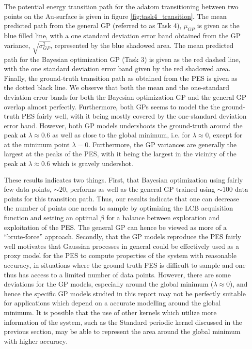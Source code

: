 \documentclass[11pt,a4paper]{article}
\begin{document}
The potential energy transition path for the adatom transitioning between two points on the Au-surface is given in figure \ref{fig:task4_transition}. The mean predicted path from the general GP (referred to as Task 4), $\mu_{GP}$ is given as the blue filled line, with a one standard deviation error band obtained from the GP variance, $\sqrt{\sigma^2_{GP}}$, represented by the blue shadowed area. The mean predicted path for the Bayesian optimization GP (Task 3) is given as the red dashed line, with the one standard deviation error band given by the red shadowed area. Finally, the ground-truth transition path as obtained from the PES is given as the dotted black line. We observe that both the mean and the one-standard deviation error bands for both the Bayesian optimization GP and the general GP overlap almost perfectly. Furthermore, both GPs seems to model the the ground-truth PES fairly well, with it being mostly covered by the one-standard deviation error band. However, both GP models undershoots the ground-truth around the peak at $\lambda\approx0.6$ as well as close to the global minimum, i.e. for $\lambda\approx 0$, except for at the minimum point $\lambda = 0$. Furthermore, the GP variances are generally the largest at the peaks of the PES, with it being the largest in the vicinity of the peak at $\lambda\approx0.6$ which is gravely undershot. 

These results indicates two things. First, that Bayesian optimization using fairly few data points, $\sim 20$, performs as well as the general GP trained using $\sim 100$ data points for this transition path. Thus, our results indicate that one can decrease the number of points one needs to sample by optimizing the LCB acquisition function and setting an optimal $\beta$ for a balance between exploration and exploitation of the PES. The general GP can hence be viewed as more of a ``brute-force'' approach. Secondly, that the GP models reproduce the PES fairly well motivates that Gaussian processes in general could be effectively used as a proxy model for the PES to compute properties of the system with reasonable accuracy, in situations where the ground-truth PES is difficult to sample and one thus has access to a limited number of data points. However, there are some deviations for the GP models, especially around the global minimum ($\lambda\approx 0$), and hence the specific GP models studied in this report may not be perfectly suitable for applications which depend on a accurate modelling around the global minimum. It is possible that the use of other kernels which utilize more information of the system, such as the Standard periodic kernel discussed in the previous section, may be able to represent the area around the global minimum with higher accuracy.




\newpage
\printbibliography
\end{document}
